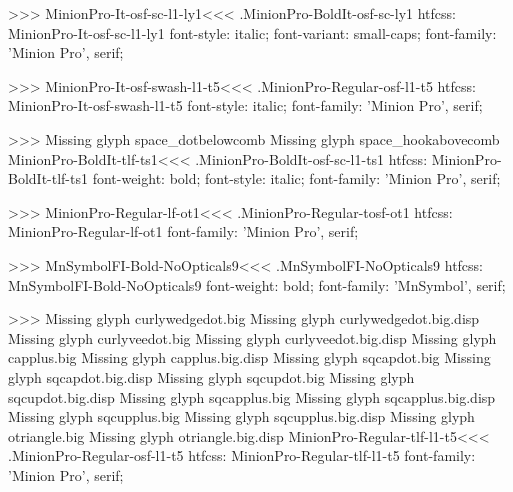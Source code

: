 {>>>
\<MinionPro-It-osf-sc-l1-ly1\><<<
.MinionPro-BoldIt-osf-sc-ly1
htfcss:  MinionPro-It-osf-sc-l1-ly1  font-style: italic; font-variant: small-caps; font-family: 'Minion Pro', serif;

>>>
\<MinionPro-It-osf-swash-l1-t5\><<<
.MinionPro-Regular-osf-l1-t5
htfcss:  MinionPro-It-osf-swash-l1-t5  font-style: italic; font-family: 'Minion Pro', serif;

>>>
Missing glyph	space_dotbelowcomb
Missing glyph	space_hookabovecomb
\<MinionPro-BoldIt-tlf-ts1\><<<
.MinionPro-BoldIt-osf-sc-l1-ts1
htfcss:  MinionPro-BoldIt-tlf-ts1  font-weight: bold; font-style: italic; font-family: 'Minion Pro', serif;

>>>
\<MinionPro-Regular-lf-ot1\><<<
.MinionPro-Regular-tosf-ot1
htfcss:  MinionPro-Regular-lf-ot1  font-family: 'Minion Pro', serif;

>>>
\<MnSymbolFI-Bold-NoOpticals9\><<<
.MnSymbolFI-NoOpticals9
htfcss:  MnSymbolFI-Bold-NoOpticals9  font-weight: bold; font-family: 'MnSymbol', serif;

>>>
Missing glyph	curlywedgedot.big
Missing glyph	curlywedgedot.big.disp
Missing glyph	curlyveedot.big
Missing glyph	curlyveedot.big.disp
Missing glyph	capplus.big
Missing glyph	capplus.big.disp
Missing glyph	sqcapdot.big
Missing glyph	sqcapdot.big.disp
Missing glyph	sqcupdot.big
Missing glyph	sqcupdot.big.disp
Missing glyph	sqcapplus.big
Missing glyph	sqcapplus.big.disp
Missing glyph	sqcupplus.big
Missing glyph	sqcupplus.big.disp
Missing glyph	otriangle.big
Missing glyph	otriangle.big.disp
\<MinionPro-Regular-tlf-l1-t5\><<<
.MinionPro-Regular-osf-l1-t5
htfcss:  MinionPro-Regular-tlf-l1-t5  font-family: 'Minion Pro', serif;

}
